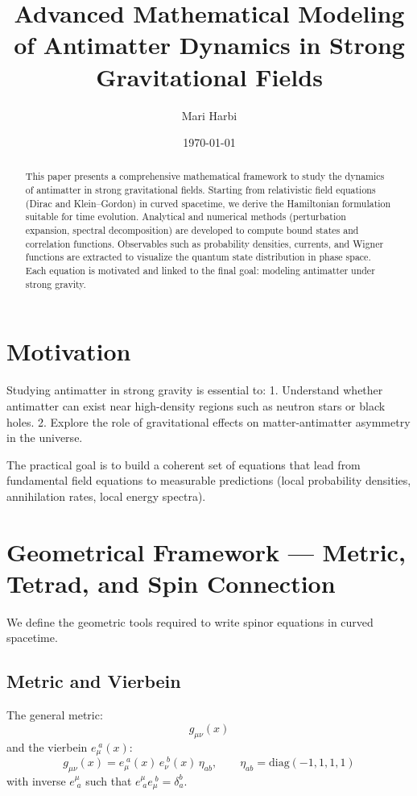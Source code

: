 \documentclass[12pt,a4paper]{article}
\title{Advanced Mathematical Modeling of Antimatter Dynamics in Strong Gravitational Fields}
\author{Mari Harbi}
\date{\today}
\begin{document}
\maketitle

\begin{abstract}
This paper presents a comprehensive mathematical framework to study the dynamics of antimatter in strong gravitational fields. Starting from relativistic field equations (Dirac and Klein--Gordon) in curved spacetime, we derive the Hamiltonian formulation suitable for time evolution. Analytical and numerical methods (perturbation expansion, spectral decomposition) are developed to compute bound states and correlation functions. Observables such as probability densities, currents, and Wigner functions are extracted to visualize the quantum state distribution in phase space. Each equation is motivated and linked to the final goal: modeling antimatter under strong gravity.
\end{abstract}

\section{Motivation}
Studying antimatter in strong gravity is essential to:  
1. Understand whether antimatter can exist near high-density regions such as neutron stars or black holes.  
2. Explore the role of gravitational effects on matter-antimatter asymmetry in the universe.  

The practical goal is to build a coherent set of equations that lead from fundamental field equations to measurable predictions (local probability densities, annihilation rates, local energy spectra).

\section{Geometrical Framework — Metric, Tetrad, and Spin Connection}
We define the geometric tools required to write spinor equations in curved spacetime.

\subsection{Metric and Vierbein}
The general metric:
\[
g_{\mu\nu}(x)
\]
and the vierbein \(e_\mu^{\;a}(x)\):
\[
g_{\mu\nu}(x)=e_\mu^{\;a}(x)\,e_\nu^{\;b}(x)\,\eta_{ab},\qquad \eta_{ab}=\mathrm{diag}(-1,1,1,1)
\]
with inverse \(e^\mu_{\;a}\) such that \(e^\mu_{\;a} e_\mu^{\;b}=\delta_a^b\).
\end{document}
